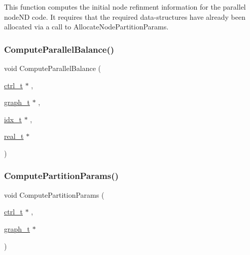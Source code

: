This function computes the initial node refinment information for the parallel node\+ND code. It requires that the required data-\/structures have already been allocated via a call to Allocate\+Node\+Partition\+Params. \mbox{\label{a00951_afef3cc98a01f5b40ef6f3dbae319c60c}} 
\subsubsection{\texorpdfstring{Compute\+Parallel\+Balance()}{ComputeParallelBalance()}}
{\footnotesize\ttfamily void Compute\+Parallel\+Balance (\begin{DoxyParamCaption}\item[{\hyperlink{a00742}{ctrl\+\_\+t} $\ast$}]{,  }\item[{\hyperlink{a00734}{graph\+\_\+t} $\ast$}]{,  }\item[{\hyperlink{a00876_aaa5262be3e700770163401acb0150f52}{idx\+\_\+t} $\ast$}]{,  }\item[{\hyperlink{a00876_a1924a4f6907cc3833213aba1f07fcbe9}{real\+\_\+t} $\ast$}]{ }\end{DoxyParamCaption})}

\mbox{\label{a00951_ad1ea0dae24c2f47fd0813124bff0b66e}} 
\subsubsection{\texorpdfstring{Compute\+Partition\+Params()}{ComputePartitionParams()}}
{\footnotesize\ttfamily void Compute\+Partition\+Params (\begin{DoxyParamCaption}\item[{\hyperlink{a00742}{ctrl\+\_\+t} $\ast$}]{,  }\item[{\hyperlink{a00734}{graph\+\_\+t} $\ast$}]{ }\end{DoxyParamCaption})}

